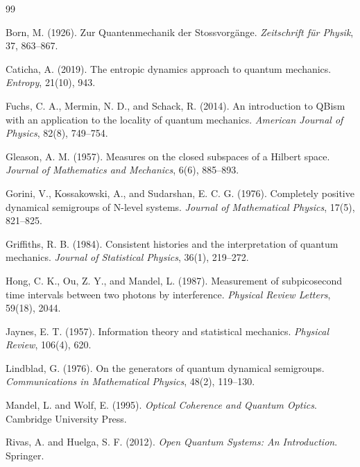 \documentclass[11pt, openright, twoside]{book}
\theoremstyle{plain}
\theoremstyle{definition}
\theoremstyle{remark}
\begin{document}

\begin{thebibliography}{99}

Born, M. (1926).
Zur Quantenmechanik der Stossvorg\"{a}nge.
\textit{Zeitschrift f\"{u}r Physik}, 37, 863--867.

Caticha, A. (2019).
The entropic dynamics approach to quantum mechanics.
\textit{Entropy}, 21(10), 943.

Fuchs, C. A., Mermin, N. D., and Schack, R. (2014).
An introduction to QBism with an application to the locality of quantum mechanics.
\textit{American Journal of Physics}, 82(8), 749--754.

Gleason, A. M. (1957).
Measures on the closed subspaces of a Hilbert space.
\textit{Journal of Mathematics and Mechanics}, 6(6), 885--893.

Gorini, V., Kossakowski, A., and Sudarshan, E. C. G. (1976).
Completely positive dynamical semigroups of N-level systems.
\textit{Journal of Mathematical Physics}, 17(5), 821--825.

Griffiths, R. B. (1984).
Consistent histories and the interpretation of quantum mechanics.
\textit{Journal of Statistical Physics}, 36(1), 219--272.

Hong, C. K., Ou, Z. Y., and Mandel, L. (1987).
Measurement of subpicosecond time intervals between two photons by interference.
\textit{Physical Review Letters}, 59(18), 2044.

Jaynes, E. T. (1957).
Information theory and statistical mechanics.
\textit{Physical Review}, 106(4), 620.

Lindblad, G. (1976).
On the generators of quantum dynamical semigroups.
\textit{Communications in Mathematical Physics}, 48(2), 119--130.

Mandel, L. and Wolf, E. (1995).
\textit{Optical Coherence and Quantum Optics}.
Cambridge University Press.

Rivas, A. and Huelga, S. F. (2012).
\textit{Open Quantum Systems: An Introduction}.
Springer.


\end{thebibliography}
\end{document}
